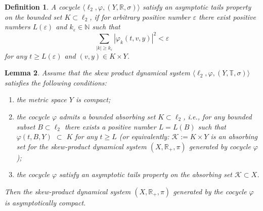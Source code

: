 \documentclass{amsart}%
\newtheorem{lemma}{Lemma}[section]
\newtheorem{definition}[lemma]{Definition}
\begin{document}
\begin{definition}\label{defCD1} A cocycle $\langle \ell_{2},\varphi,(Y,\mathbb
R,\sigma)\rangle$ satisfy an asymptotic tails property on the
bounded set $K\subset \ell_{2}$, if for arbitrary positive number
$\varepsilon$ there exist positive numbers $L(\varepsilon)$ and
$k_{\varepsilon}\in \mathbb N$ such that
\begin{equation}\label{eqAT1}
\sum\limits_{|k|\ge k_{\varepsilon}}
|\varphi_{k}(t,v,y)|^{2}<\varepsilon
\end{equation}
for any $t\ge L(\varepsilon)$ and $(v,y)\in K\times Y$.
\end{definition}

\begin{lemma}\label{lCD1} Assume that the skew product dynamical
system $\langle \ell_{2},\varphi,(Y,\mathbb T,\sigma)\rangle$
satisfies the following conditions:
\begin{enumerate}
\item the metric space $Y$ is compact; \item the cocycle $\varphi$
admits a bounded absorbing set $K\subset \ell_{2}$, i.e., for any
bounded subset $B\subset \ell_{2}$ there exists a positive number
$L=L(B)$ such that $\varphi(t,B,Y)$ $\subset $ $K$ for any $t\ge
L$ (or equivalently: $\mathcal K:=K\times Y$ is an absorbing set
for the skew-product dynamical system $(X,\mathbb R_{+},\pi)$
generated by cocycle $\varphi$); \item the cocycle $\varphi$
satisfy an asymptotic tails property on the absorbing set
$\mathcal K \subset X$.
\end{enumerate}

Then the skew-product dynamical system $(X,\mathbb R_{+},\pi)$
generated by the cocycle $\varphi$ is asymptotically compact.
\end{lemma}
\end{document}
